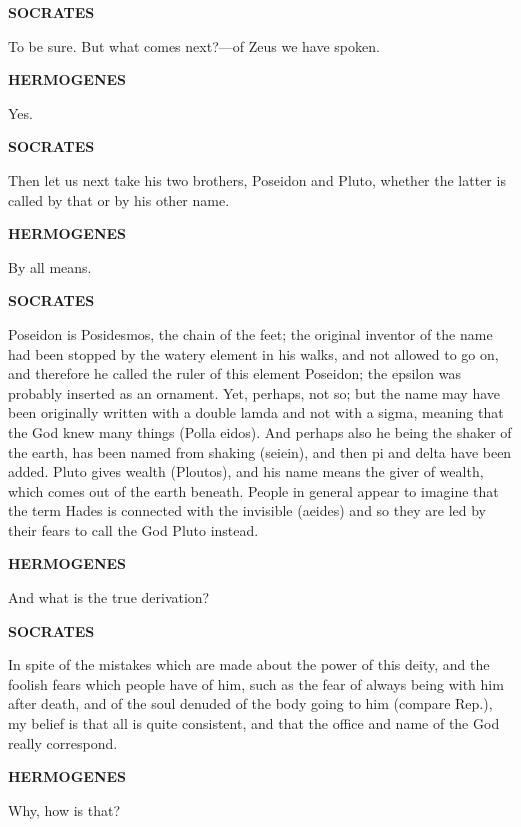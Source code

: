 \documentclass[11pt,letter]{article}
\begin{document}
\par \textbf{SOCRATES}
\par   To be sure. But what comes next?—of Zeus we have spoken.

\par \textbf{HERMOGENES}
\par   Yes.

\par \textbf{SOCRATES}
\par   Then let us next take his two brothers, Poseidon and Pluto, whether the latter is called by that or by his other name.

\par \textbf{HERMOGENES}
\par   By all means.

\par \textbf{SOCRATES}
\par   Poseidon is Posidesmos, the chain of the feet; the original inventor of the name had been stopped by the watery element in his walks, and not allowed to go on, and therefore he called the ruler of this element Poseidon; the epsilon was probably inserted as an ornament. Yet, perhaps, not so; but the name may have been originally written with a double lamda and not with a sigma, meaning that the God knew many things (Polla eidos). And perhaps also he being the shaker of the earth, has been named from shaking (seiein), and then pi and delta have been added. Pluto gives wealth (Ploutos), and his name means the giver of wealth, which comes out of the earth beneath. People in general appear to imagine that the term Hades is connected with the invisible (aeides) and so they are led by their fears to call the God Pluto instead.

\par \textbf{HERMOGENES}
\par   And what is the true derivation?

\par \textbf{SOCRATES}
\par   In spite of the mistakes which are made about the power of this deity, and the foolish fears which people have of him, such as the fear of always being with him after death, and of the soul denuded of the body going to him (compare Rep.), my belief is that all is quite consistent, and that the office and name of the God really correspond.

\par \textbf{HERMOGENES}
\par   Why, how is that?
\end{document}
